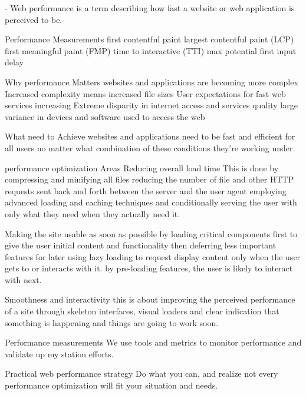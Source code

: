 - Web performance is a term describing how fast a website or web application is perceived to be.

Performance Measurements 
  first contentful paint
  largest contentful paint (LCP)
  first meaningful paint (FMP)
  time to interactive  (TTI)
  max potential first input delay

Why performance Matters 
  websites and applications are becoming more complex 
  Increased complexity means increased file sizes 
  User expectations for fast web services increasing 
  Extreme disparity in internet access and services quality 
  large variance in devices and software used to access the web 

What need to Achieve 
  websites and applications need to be fast and efficient for all users no 
  matter what combination of these conditions they're working under. 

performance optimization Areas
  Reducing overall load time 
    This is done by compressing and minifying all files
    reducing the number of file and other HTTP requests sent back and forth between the server and the user agent
    employing advanced loading and caching techniques 
    and conditionally serving the user with only what they need when they actually need it. 

  Making the site usable as soon as possible 
    by loading critical components first to give the user initial content and functionality 
    then deferring less important features for later using lazy loading to request 
    display content only when the user gets to or interacts with it.
    by pre-loading features, the user is likely to interact with next. 

  Smoothness and interactivity 
    this is about improving the perceived performance of a site through skeleton interfaces, 
    visual loaders and clear indication that something is happening and things are going to work soon.

  Performance measurements 
    We use tools and metrics to monitor performance and validate up my station efforts.

Practical web performance strategy 
Do what you can, and realize not every performance optimization will fit your situation and needs.

  

  